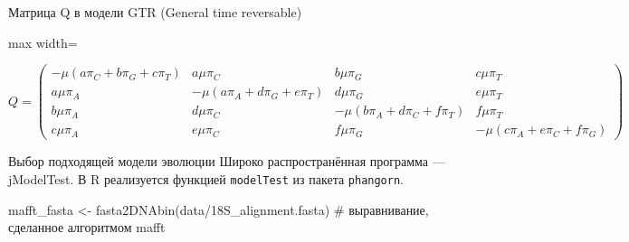 \documentclass[
  ignorenonframetext,
  russian,
]{beamer}
\newenvironment{Shaded}{\begin{snugshade}}{\end{snugshade}}
\newcommand{\AttributeTok}[1]{\textcolor[rgb]{0.40,0.45,0.13}{#1}}
\newcommand{\CommentTok}[1]{\textcolor[rgb]{0.37,0.37,0.37}{#1}}
\newcommand{\ConstantTok}[1]{\textcolor[rgb]{0.56,0.35,0.01}{#1}}
\newcommand{\DecValTok}[1]{\textcolor[rgb]{0.68,0.00,0.00}{#1}}
\newcommand{\FunctionTok}[1]{\textcolor[rgb]{0.28,0.35,0.67}{#1}}
\newcommand{\NormalTok}[1]{\textcolor[rgb]{0.00,0.23,0.31}{#1}}
\newcommand{\OtherTok}[1]{\textcolor[rgb]{0.00,0.23,0.31}{#1}}
\newcommand{\SpecialCharTok}[1]{\textcolor[rgb]{0.37,0.37,0.37}{#1}}
\newcommand{\StringTok}[1]{\textcolor[rgb]{0.13,0.47,0.30}{#1}}
\begin{document}
\begin{frame}{Матрица Q в модели GTR (General time reversable)}
\protect{}\label{ux43cux430ux442ux440ux438ux446ux430-q-ux432-ux43cux43eux434ux435ux43bux438-gtr-general-time-reversable}
\begin{adjustbox}{max width=\textwidth}

\(
Q = \begin{pmatrix}
-\mu(a\pi_{C} + b\pi_{G} + c\pi_{T}) & a \mu \pi_{C} & b \mu \pi_{G} & c \mu \pi_{T} \\
a \mu \pi_{A} & - \mu(a\pi_{A} + d\pi_{G} + e\pi_{T}) & d \mu \pi_{G} & e \mu \pi_{T} \\
b \mu \pi_{A} & d \mu \pi_{C} & - \mu(b\pi_{A} + d\pi_{C} + f\pi_{T}) & f \mu \pi_{T} \\
c \mu \pi_{A} & e \mu \pi_{C} & f \mu \pi_{G} & - \mu(c\pi_{A} + e\pi_{C} + f\pi_{G})
\end{pmatrix}
\)
\end{adjustbox}
\end{frame}

\begin{frame}[fragile]{Выбор подходящей модели эволюции}
\protect{}\label{ux432ux44bux431ux43eux440-ux43fux43eux434ux445ux43eux434ux44fux449ux435ux439-ux43cux43eux434ux435ux43bux438-ux44dux432ux43eux43bux44eux446ux438ux438}
Широко распространённая программа --- jModelTest. В R реализуется
функцией \texttt{modelTest} из пакета \texttt{phangorn}.

\begin{Shaded}
\begin{Highlighting}[]
\NormalTok{mafft\_fasta }\OtherTok{\textless{}{-}} \FunctionTok{fasta2DNAbin}\NormalTok{(}\StringTok{\textquotesingle{}data/18S\_alignment.fasta\textquotesingle{}}\NormalTok{) }\CommentTok{\# выравнивание, сделанное алгоритмом mafft}
\end{Highlighting}
\end{Shaded}

\begin{Shaded}
\end{Shaded}
\end{frame}
\end{document}
